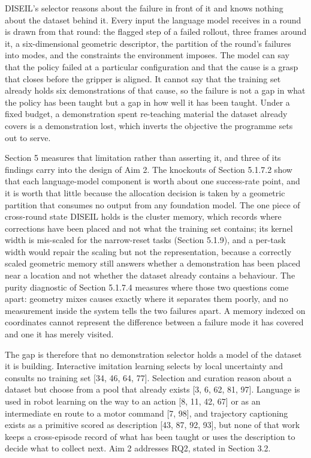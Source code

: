 \documentclass[
  11pt,
]{article}
\begin{document}
DISEIL's selector reasons about the failure in front of it and knows
nothing about the dataset behind it. Every input the language model
receives in a round is drawn from that round: the flagged step of a
failed rollout, three frames around it, a six-dimensional geometric
descriptor, the partition of the round's failures into modes, and the
constraints the environment imposes. The model can say that the policy
failed at a particular configuration and that the cause is a grasp that
closes before the gripper is aligned. It cannot say that the training
set already holds six demonstrations of that cause, so the failure is
not a gap in what the policy has been taught but a gap in how well it
has been taught. Under a fixed budget, a demonstration spent re-teaching
material the dataset already covers is a demonstration lost, which
inverts the objective the programme sets out to serve.

Section 5 measures that limitation rather than asserting it, and three
of its findings carry into the design of Aim 2. The knockouts of Section
5.1.7.2 show that each language-model component is worth about one
success-rate point, and it is worth that little because the allocation
decision is taken by a geometric partition that consumes no output from
any foundation model. The one piece of cross-round state DISEIL holds is
the cluster memory, which records where corrections have been placed and
not what the training set contains; its kernel width is mis-scaled for
the narrow-reset tasks (Section 5.1.9), and a per-task width would
repair the scaling but not the representation, because a correctly
scaled geometric memory still answers whether a demonstration has been
placed near a location and not whether the dataset already contains a
behaviour. The purity diagnostic of Section 5.1.7.4 measures where those
two questions come apart: geometry mixes causes exactly where it
separates them poorly, and no measurement inside the system tells the
two failures apart. A memory indexed on coordinates cannot represent the
difference between a failure mode it has covered and one it has merely
visited.

The gap is therefore that no demonstration selector holds a model of the
dataset it is building. Interactive imitation learning selects by local
uncertainty and consults no training set {[}34, 46, 64, 77{]}. Selection
and curation reason about a dataset but choose from a pool that already
exists {[}3, 6, 62, 81, 97{]}. Language is used in robot learning on the
way to an action {[}8, 11, 42, 67{]} or as an intermediate en route to a
motor command {[}7, 98{]}, and trajectory captioning exists as a
primitive scored as description {[}43, 87, 92, 93{]}, but none of that
work keeps a cross-episode record of what has been taught or uses the
description to decide what to collect next. Aim 2 addresses RQ2, stated
in Section 3.2.
\end{document}
